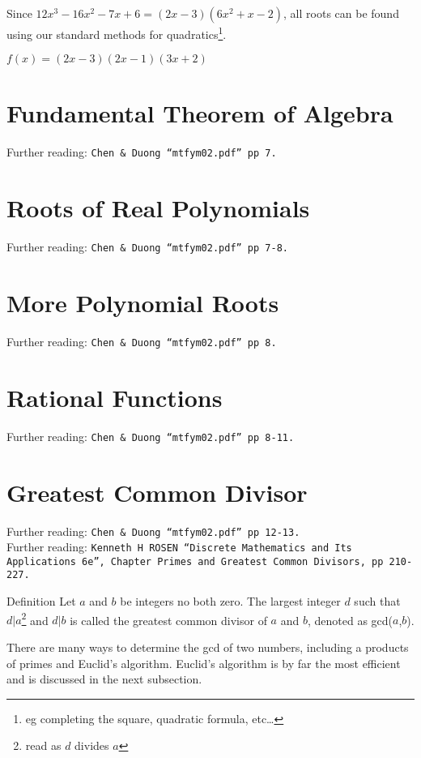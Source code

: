 Since $12x^3 -16x^2 -7x +6 = (2x-3)(6x^2 +x -2)$, all roots can be found using
our standard methods for quadratics\footnote{eg completing the square, quadratic
formula, etc\ldots}.

$f(x) = (2x-3)(2x-1)(3x+2)$ 

\section{Fundamental Theorem of Algebra}
\label{sec:P Fundamental Theorem of Algebra}
Further reading: \texttt{Chen \& Duong ``mtfym02.pdf'' pp 7.}

\section{Roots of Real Polynomials}
\label{sec:P Roots of Real Polynomial}
Further reading: \texttt{Chen \& Duong ``mtfym02.pdf'' pp 7-8.}

\section{More Polynomial Roots}
\label{sec:P More Polynomial Root}
Further reading: \texttt{Chen \& Duong ``mtfym02.pdf'' pp 8.}

\section{Rational Functions}
\label{sec:P Rational Functions}
Further reading: \texttt{Chen \& Duong ``mtfym02.pdf'' pp 8-11.}

\section{Greatest Common Divisor}
\label{sec:P Greatest Common Divisor}
Further reading: \texttt{Chen \& Duong ``mtfym02.pdf'' pp 12-13.} \\
Further reading: \texttt{Kenneth H ROSEN ``Discrete Mathematics and Its
Applications 6e'', Chapter Primes and Greatest Common Divisors, pp 210-227.}
\begin{remember}{Definition}
  Let $a$ and $b$ be integers no both zero. The largest integer $d$ such that
  $d | a$\footnote{read as $d$ divides $a$} and $d | b$ is called the greatest
  common divisor of $a$ and $b$, denoted as gcd($a$,$b$).
\end{remember}

There are many ways to determine the gcd of two numbers, including a products of
primes and Euclid's algorithm. Euclid's algorithm is by far the most efficient
and is discussed in the next subsection.

